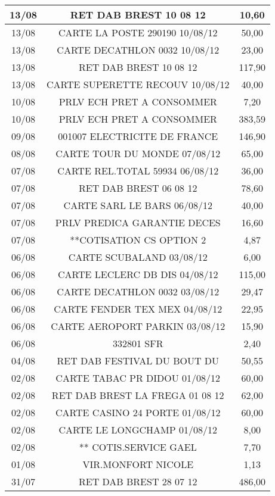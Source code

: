 \begin{tabular}{|c|c|c|}
\hline
13/08 & RET DAB BREST          10 08 12 & 10,60 \\
\hline
13/08 & CARTE LA POSTE 290190  10/08/12 & 50,00 \\
\hline
13/08 & CARTE DECATHLON 0032   10/08/12 & 23,00 \\
\hline
13/08 & RET DAB BREST          10 08 12 & 117,90 \\
\hline
13/08 & CARTE SUPERETTE RECOUV 10/08/12 & 40,00 \\
\hline
10/08 & PRLV ECH PRET A CONSOMMER & 7,20 \\
\hline
10/08 & PRLV ECH PRET A CONSOMMER & 383,59 \\
\hline
09/08 & 001007 ELECTRICITE DE FRANCE & 146,90 \\
\hline
08/08 & CARTE TOUR DU MONDE    07/08/12 & 65,00 \\
\hline
07/08 & CARTE REL.TOTAL 59934  06/08/12 & 36,00 \\
\hline
07/08 & RET DAB BREST          06 08 12 & 78,60 \\
\hline
07/08 & CARTE SARL LE BARS     06/08/12 & 40,00 \\
\hline
07/08 & PRLV   PREDICA GARANTIE DECES & 16,60 \\
\hline
07/08 & **COTISATION CS OPTION 2 & 4,87 \\
\hline
06/08 & CARTE SCUBALAND        03/08/12 & 6,00 \\
\hline
06/08 & CARTE LECLERC DB DIS   04/08/12 & 115,00 \\
\hline
06/08 & CARTE DECATHLON 0032   03/08/12 & 29,47 \\
\hline
06/08 & CARTE FENDER TEX MEX   04/08/12 & 22,95 \\
\hline
06/08 & CARTE AEROPORT PARKIN  03/08/12 & 15,90 \\
\hline
06/08 & 332801 SFR & 2,40 \\
\hline
04/08 & RET DAB FESTIVAL DU BOUT DU & 50,55 \\
\hline
02/08 & CARTE TABAC PR DIDOU   01/08/12 & 60,00 \\
\hline
02/08 & RET DAB BREST LA FREGA 01 08 12 & 62,00 \\
\hline
02/08 & CARTE CASINO 24 PORTE  01/08/12 & 60,00 \\
\hline
02/08 & CARTE LE LONGCHAMP     01/08/12 & 8,00 \\
\hline
02/08 & ** COTIS.SERVICE GAEL & 7,70 \\
\hline
01/08 & VIR.MONFORT NICOLE & 1,13 \\
\hline
31/07 & RET DAB BREST          28 07 12 & 486,00 \\
\hline
\end{tabular}
